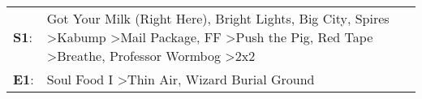 \begin{supertabular}{p{0.03\textwidth}p{0.92\textwidth}}
 \textbf{S1}:  &  Got Your Milk (Right Here)\textsuperscript{}, \enspace Bright Lights, Big City\textsuperscript{}, \enspace Spires\textsuperscript{} \textgreater \enspace Kabump\textsuperscript{} \textgreater \enspace Mail Package\textsuperscript{}, \enspace FF\textsuperscript{} \textgreater \enspace Push the Pig\textsuperscript{}, \enspace Red Tape\textsuperscript{} \textgreater \enspace Breathe\textsuperscript{}, \enspace Professor Wormbog\textsuperscript{} \textgreater \enspace 2x2\textsuperscript{}  \enspace  \\
 \textbf{E1}:  &                                                                                                                                                                                                                                                                                                                                                                             Soul Food I\textsuperscript{} \textgreater \enspace Thin Air\textsuperscript{}, \enspace Wizard Burial Ground\textsuperscript{}  \enspace  \\
\end{supertabular}
